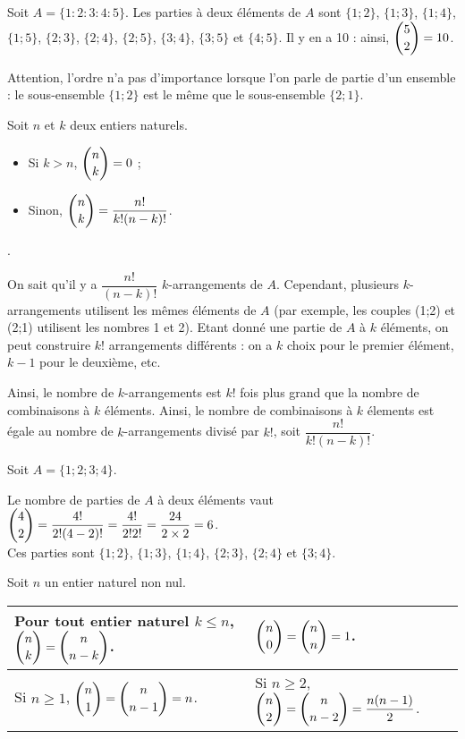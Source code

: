 \documentclass[11pt,fleqn, openany]{book} %
\begin{document}
\begin{example}Soit $A=\{1:2:3:4:5\}$. Les parties à deux éléments de $A$ sont $\{1;2\}$, $\{1;3\}$, $\{1;4\}$, $\{1;5\}$, $\{2;3\}$, $\{2;4\}$, $\{2;5\}$, $\{3;4\}$, $\{3;5\}$ et $\{4;5\}$. Il y en a 10 : ainsi, $\dbinom{5}{2}=10$.\end{example}

Attention, l'ordre n'a pas d'importance lorsque l'on parle de partie d'un ensemble : le sous-ensemble $\{1;2\}$ est le même que le sous-ensemble $\{2;1\}$.


\begin{proposition} Soit $n$ et $k$ deux entiers naturels.
\begin{itemize}
\item Si $k > n$, $\dbinom{n}{k}=0$ ;
\item Sinon, $\dbinom{n}{k} = \dfrac{n!}{k!(n-k)!}$.
\end{itemize}
.\end{proposition}

\begin{demonstration}On sait qu'il y a $\dfrac{n!}{(n-k)!}$ $k$-arrangements de $A$. Cependant, plusieurs $k$-arrangements utilisent les mêmes éléments de $A$ (par exemple, les couples (1;2) et (2;1) utilisent les nombres 1 et 2). Etant donné une partie de $A$ à $k$ éléments, on peut construire $k!$ arrangements différents : on a $k$ choix pour le premier élément, $k-1$ pour le deuxième, etc.

Ainsi, le nombre de $k$-arrangements est $k!$ fois plus grand que la nombre de combinaisons à $k$ éléments. Ainsi, le nombre de combinaisons à $k$ élements est égale au nombre de $k$-arrangements divisé par $k!$, soit $\dfrac{n!}{k!(n-k)!}$.\end{demonstration}

\newpage

\begin{example} Soit $A=\{1;2;3;4\}$. 

Le nombre de parties de $A$ à deux éléments vaut $\dbinom{4}{2}=\dfrac{4!}{2!(4-2)!}=\dfrac{4!}{2!2!}=\dfrac{24}{2 \times 2}=6$.\\ Ces parties sont $\{1;2\}$, $\{1;3\}$, $\{1;4\}$, $\{2;3\}$, $\{2;4\}$ et $\{3;4\}$.\end{example}



\begin{proposition} Soit $n$ un entier naturel non nul. 

\begin{tabularx}{\linewidth}{X|X}
Pour tout entier naturel $k \leqslant n$, $\dbinom{n}{k}=\dbinom{n}{n-k}$. & $\dbinom{n}{0}=\dbinom{n}{n}=1$. \\
\hline
Si $n\geqslant 1$, $\dbinom{n}{1}=\dbinom{n}{n-1}=n$. & Si $n\geqslant 2$, $\dbinom{n}{2}=\dbinom{n}{n-2}=\dfrac{n(n-1)}{2}$.
\end{tabularx}

\end{proposition}
\end{document}
